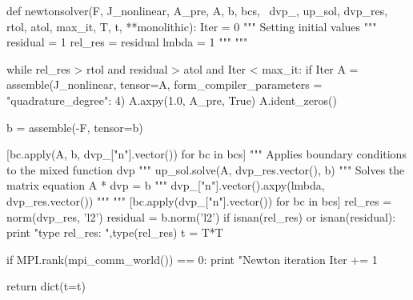 \begin{python}
def newtonsolver(F, J_nonlinear, A_pre, A, b, bcs, \
                dvp_, up_sol, dvp_res, rtol, atol, max_it, T, t, **monolithic):
    Iter      = 0  """ Setting initial values """
    residual   = 1  
    rel_res    = residual
    lmbda = 1 """  """

    while rel_res > rtol and residual > atol and Iter < max_it:
        if Iter %
            A = assemble(J_nonlinear, tensor=A, form_compiler_parameters = {"quadrature_degree": 4})
            A.axpy(1.0, A_pre, True)
            A.ident_zeros()

        b = assemble(-F, tensor=b)

        [bc.apply(A, b, dvp_["n"].vector()) for bc in bcs] """ Applies boundary conditions to the mixed function dvp """
        up_sol.solve(A, dvp_res.vector(), b) """ Solves the matrix equation A * dvp = b """
        dvp_["n"].vector().axpy(lmbda, dvp_res.vector())   """   """
        [bc.apply(dvp_["n"].vector()) for bc in bcs]
        rel_res = norm(dvp_res, 'l2')
        residual = b.norm('l2')
        if isnan(rel_res) or isnan(residual):
            print "type rel_res: ",type(rel_res)
            t = T*T

        if MPI.rank(mpi_comm_world()) == 0:
            print "Newton iteration %
        Iter += 1

    return dict(t=t)
\end{python}




	
